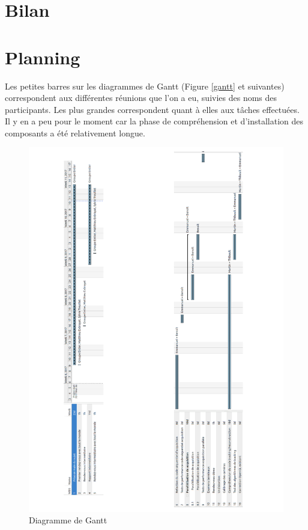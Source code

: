 \documentclass{article}
\begin{document}


\section{Bilan}





\section{Planning}

Les petites barres sur les diagrammes de Gantt (Figure \ref{gantt} et suivantes) correspondent aux différentes réunions que l'on a eu, suivies des noms des participants. Les plus grandes correspondent quant à elles aux tâches effectuées. Il y en a peu pour le moment car la phase de compréhension et d'installation des composants a été relativement longue.

\newpage
\begin{figure}
	\includegraphics[scale=0.3]{Modules/Picture/gantt_0_1}
	\caption{Diagramme de Gantt}
\end{figure}
\end{document}
